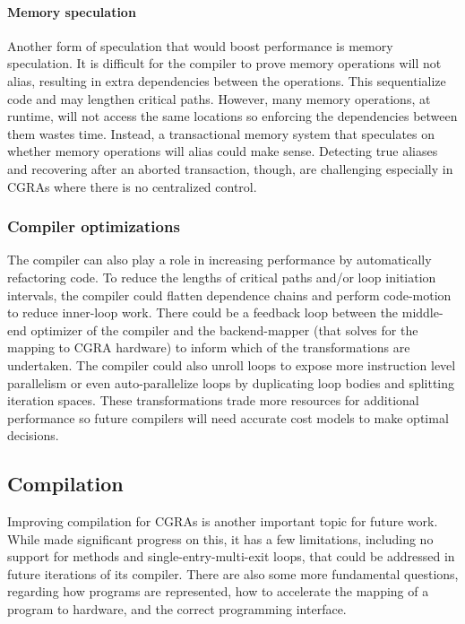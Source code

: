 \paragraph{Memory speculation}
Another form of speculation that would boost performance is memory speculation.
% 
% 
It is difficult for the compiler to prove memory operations will not alias, resulting in extra dependencies between the operations.
% 
This sequentialize code and may lengthen critical paths.
% 
However, many memory operations, at runtime, will not access the same locations so enforcing the dependencies between them wastes time.
% 
Instead, a transactional memory system that speculates on whether memory operations will alias could make sense.
% 
Detecting true aliases and recovering after an aborted transaction, though, are challenging especially in CGRAs where there is no centralized control.

\subsubsection{Compiler optimizations}
The compiler can also play a role in increasing performance by automatically refactoring code.
%
To reduce the lengths of critical paths and/or loop initiation intervals, the compiler could flatten dependence chains and perform code-motion to reduce inner-loop work.
% 
There could be a feedback loop between the middle-end optimizer of the compiler and the backend-mapper (that solves for the mapping to CGRA hardware) to inform which of the transformations are undertaken.
% 
The compiler could also unroll loops to expose more instruction level parallelism or even auto-parallelize loops by duplicating loop bodies and splitting iteration spaces.
% 
These transformations trade more resources for additional performance so future compilers will need accurate cost models to make optimal decisions.

\subsection{Compilation}
Improving compilation for CGRAs is another important topic for future work.
% 
While \riptide made significant progress on this, it has a few limitations, including no support for methods and single-entry-multi-exit loops, that could be addressed in future iterations of its compiler.
% 
There are also some more fundamental questions, regarding how programs are represented, how to accelerate the mapping of a program to hardware, and the correct programming interface.

